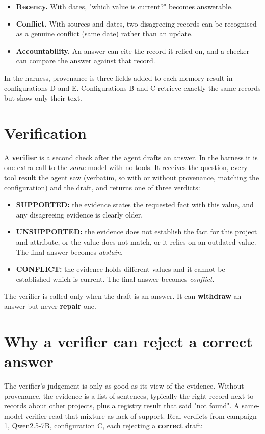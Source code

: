 \documentclass[10.5pt,a4paper,oneside]{report}
\begin{document}
\begin{itemize}
\item \textbf{Recency.} With dates, "which value is current?" becomes answerable.
\item \textbf{Conflict.} With sources and dates, two disagreeing records can be recognised as a genuine conflict (same date) rather than an update.
\item \textbf{Accountability.} An answer can cite the record it relied on, and a checker can compare the answer against that record.
\end{itemize}
In the harness, provenance is three fields added to each memory result in configurations D and E. Configurations B and C retrieve exactly the same records but show only their text.

\section{Verification}
A \textbf{verifier} is a second check after the agent drafts an answer. In the harness it is one extra call to the \emph{same} model with no tools. It receives the question, every tool result the agent saw (verbatim, so with or without provenance, matching the configuration) and the draft, and returns one of three verdicts:

\begin{itemize}
\item \textbf{SUPPORTED:} the evidence states the requested fact with this value, and any disagreeing evidence is clearly older.
\item \textbf{UNSUPPORTED:} the evidence does not establish the fact for this project and attribute, or the value does not match, or it relies on an outdated value. The final answer becomes \emph{abstain}.
\item \textbf{CONFLICT:} the evidence holds different values and it cannot be established which is current. The final answer becomes \emph{conflict}.
\end{itemize}
The verifier is called only when the draft is an answer. It can \textbf{withdraw} an answer but never \textbf{repair} one.

\section{Why a verifier can reject a correct answer}
The verifier's judgement is only as good as its view of the evidence. Without provenance, the evidence is a list of sentences, typically the right record next to records about other projects, plus a registry result that said "not found". A same-model verifier read that mixture as lack of support. Real verdicts from campaign 1, Qwen2.5-7B, configuration C, each rejecting a \textbf{correct} draft:
\end{document}
